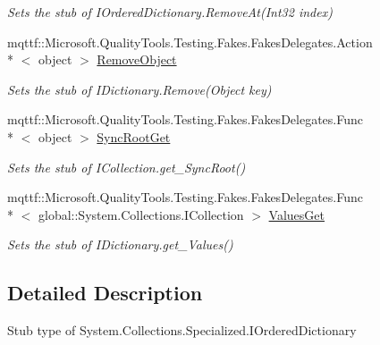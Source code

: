 \begin{DoxyCompactItemize}
\begin{DoxyCompactList}\small\item\em Sets the stub of I\-Ordered\-Dictionary.\-Remove\-At(\-Int32 index)\end{DoxyCompactList}\item 
mqttf\-::\-Microsoft.\-Quality\-Tools.\-Testing.\-Fakes.\-Fakes\-Delegates.\-Action\\*
$<$ object $>$ \hyperlink{class_system_1_1_collections_1_1_specialized_1_1_fakes_1_1_stub_i_ordered_dictionary_aaf798cba0fb6c2b194f56e1f791c7b3a}{Remove\-Object}
\begin{DoxyCompactList}\small\item\em Sets the stub of I\-Dictionary.\-Remove(\-Object key)\end{DoxyCompactList}\item 
mqttf\-::\-Microsoft.\-Quality\-Tools.\-Testing.\-Fakes.\-Fakes\-Delegates.\-Func\\*
$<$ object $>$ \hyperlink{class_system_1_1_collections_1_1_specialized_1_1_fakes_1_1_stub_i_ordered_dictionary_ae6b8b8c57ff1f90a736d96701306a215}{Sync\-Root\-Get}
\begin{DoxyCompactList}\small\item\em Sets the stub of I\-Collection.\-get\-\_\-\-Sync\-Root()\end{DoxyCompactList}\item 
mqttf\-::\-Microsoft.\-Quality\-Tools.\-Testing.\-Fakes.\-Fakes\-Delegates.\-Func\\*
$<$ global\-::\-System.\-Collections.\-I\-Collection $>$ \hyperlink{class_system_1_1_collections_1_1_specialized_1_1_fakes_1_1_stub_i_ordered_dictionary_a23e0d2825e0d1cd60595b71866706e9b}{Values\-Get}
\begin{DoxyCompactList}\small\item\em Sets the stub of I\-Dictionary.\-get\-\_\-\-Values()\end{DoxyCompactList}\end{DoxyCompactItemize}


\subsection{Detailed Description}
Stub type of System.\-Collections.\-Specialized.\-I\-Ordered\-Dictionary



